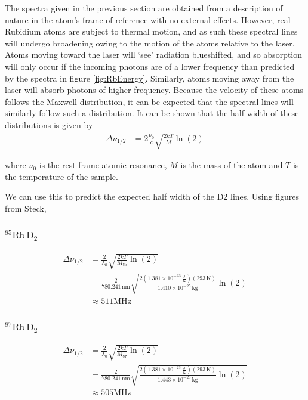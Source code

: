 \documentclass[12pt]{article}
\begin{document}
The spectra given in the previous section are obtained from a description of nature in the atom's frame of reference with no external effects.  However, real Rubidium atoms are subject to thermal motion, and as such these spectral lines will undergo broadening owing to the motion of the atoms relative to the laser.  Atoms moving toward the laser will `see' radiation blueshifted, and so absorption will only occur if the incoming photons are of a lower frequency than predicted by the spectra in figure \ref{fig:RbEnergy}.  Similarly, atoms moving away from the laser will absorb photons of higher frequency.  Because the velocity of these atoms follows the Maxwell distribution, it can be expected that the spectral lines will similarly follow such a distribution.  It can be shown that the half width of these distributions is given by 
\begin{align}
	\Delta \nu_{1/2} &= 2\frac{\nu_0}{c}\sqrt{\frac{2kT}{M}\ln(2)}
\end{align}

where $\nu_0$ is the rest frame atomic resonance, $M$ is the mass of the atom and $T$ is the temperature of the sample.

We can use this to predict the expected half width of the D2 lines.  Using figures from Steck\cite{steck85Rb}\cite{steck87Rb},

\subsubsection*{${}^{85}\text{Rb}\,\text{D}_2$}

\begin{align}
	\Delta \nu_{1/2} &= \frac{2}{\lambda_0}\sqrt{\frac{2kT}{M_{85}}\ln(2)}\nonumber\\
	&= \frac{2}{780.241\,\text{nm}}\sqrt{\frac{2\left(1.381\times10^{-23}\,\frac{\text{J}}{\text{K}}\right)\left(293\,\text{K}\right)}{1.410\times10^{-25}\,\text{kg}}\ln(2)}\nonumber\\
	&\approx 511 \text{MHz} \label{pred:85D2}
\end{align}

\subsubsection*{${}^{87}\text{Rb}\,\text{D}_2$}

\begin{align}
\Delta \nu_{1/2} &= \frac{2}{\lambda_0}\sqrt{\frac{2kT}{M_{87}}\ln(2)}\nonumber\\
&= \frac{2}{780.241\,\text{nm}}\sqrt{\frac{2\left(1.381\times10^{-23}\,\frac{\text{J}}{\text{K}}\right)\left(293\,\text{K}\right)}{1.443\times10^{-25}\,\text{kg}}\ln(2)}\nonumber\\
&\approx 505 \text{MHz}\label{pred:87D2}
\end{align}
\end{document}
